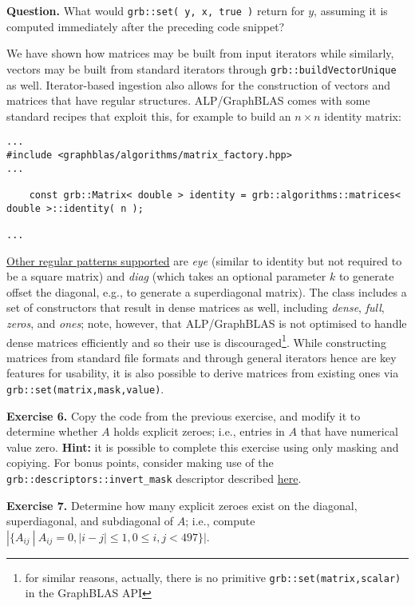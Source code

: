 \noindent \textbf{Question.} What would \texttt{grb::set( y, x, true )} return for $y$, assuming it is computed immediately after the preceding code snippet?

We have shown how matrices may be built from input iterators while similarly, vectors may be built from standard iterators through \texttt{grb::buildVectorUnique} as well. Iterator-based ingestion also allows for the construction of vectors and matrices that have regular structures. ALP/GraphBLAS comes with some standard recipes that exploit this, for example to build an $n\times n$ identity matrix:
\begin{lstlisting}
...
#include <graphblas/algorithms/matrix_factory.hpp>
...

    const grb::Matrix< double > identity = grb::algorithms::matrices< double >::identity( n );

...
\end{lstlisting}
\href{http://albert-jan.yzelman.net/alp/v0.8-preview/classgrb_1_1algorithms_1_1matrices.html#a1336accbaf6a61ebd890bef9da4116fc}{Other regular patterns supported} are \emph{eye} (similar to identity but not required to be a square matrix) and \emph{diag} (which takes an optional parameter $k$ to generate offset the diagonal, e.g., to generate a superdiagonal matrix). The class includes a set of constructors that result in dense matrices as well, including \emph{dense}, \emph{full}, \emph{zeros}, and \emph{ones}; note, however, that ALP/GraphBLAS is not optimised to handle dense matrices efficiently and so their use is discouraged\footnote{for similar reasons, actually, there is no primitive \texttt{grb::set(matrix,scalar)} in the GraphBLAS API}. While constructing matrices from standard file formats and through general iterators hence are key features for usability, it is also possible to derive matrices from existing ones via \texttt{grb::set(matrix,mask,value)}.

\noindent \textbf{Exercise 6.} Copy the code from the previous exercise, and modify it to determine whether $A$ holds explicit zeroes; i.e., entries in $A$ that have numerical value zero. \textbf{Hint:} it is possible to complete this exercise using only masking and copiying. For bonus points, consider making use of the \texttt{grb::descriptors::invert\_mask} descriptor described \href{http://albert-jan.yzelman.net/alp/v0.8-preview/namespacegrb_1_1descriptors.html}{here}.

\noindent \textbf{Exercise 7.} Determine how many explicit zeroes exist on the diagonal, superdiagonal, and subdiagonal of $A$; i.e., compute $|\{A_{ij}\ |\ A_{ij}=0, |i-j|\leq1, 0\leq i,j<497\}|$.

